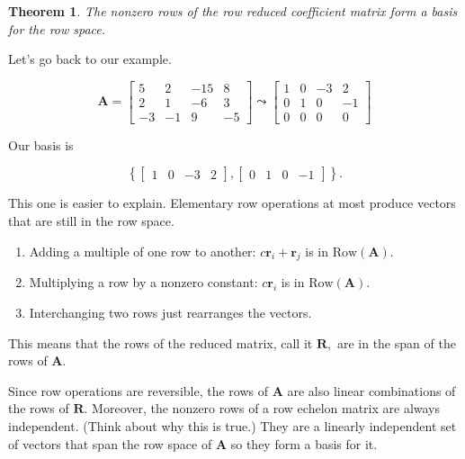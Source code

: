 \documentclass[
]{book}
\newtheorem{theorem}{Theorem}[chapter]
\theoremstyle{definition}
\theoremstyle{definition}
\theoremstyle{definition}
\theoremstyle{definition}
\theoremstyle{remark}
\begin{document}
\begin{theorembox}

\begin{theorem}
The nonzero rows of the row reduced coefficient matrix form a basis for the row space.
\end{theorem}

\end{theorembox}

Let's go back to our example.

\[\mathbf{A}=\begin{bmatrix}5 & 2 & -15 & 8 \\2 & 1 & -6 & 3\\-3 & -1 & 9 & -5\end{bmatrix}\leadsto \begin{bmatrix} 1 & 0 & -3 & 2 \\0 & 1 & 0 & -1 \\0 & 0 & 0 & 0 \end{bmatrix}\]

Our basis is

\[\left\{\begin{bmatrix}1 &0 & -3 & 2\end{bmatrix},\begin{bmatrix}0 & 1 & 0 & -1\end{bmatrix}\right\}.\]

This one is easier to explain. Elementary row operations at most produce vectors that are still in the row space.

\begin{enumerate}
\def\labelenumi{\arabic{enumi})}
\item
  Adding a multiple of one row to another: \(c\mathbf{r}_i+\mathbf{r}_j\) is in \(\text{Row}(\mathbf{A}).\)
\item
  Multiplying a row by a nonzero constant: \(c\mathbf{r}_i\) is in \(\text{Row}(\mathbf{A}).\)
\item
  Interchanging two rows just rearranges the vectors.
\end{enumerate}

This means that the rows of the reduced matrix, call it \(\mathbf{R},\) are in the span of the rows of \(\mathbf{A}.\)

Since row operations are reversible, the rows of \(\mathbf{A}\) are also linear combinations of the rows of \(\mathbf{R}.\) Moreover, the nonzero rows of a row echelon matrix are always independent. (Think about why this is true.) They are a linearly independent set of vectors that span the row space of \(\mathbf{A}\) so they form a basis for it.
\end{document}
